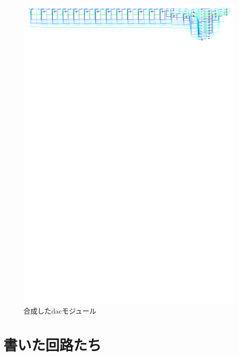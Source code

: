 \documentclass[a4paper,10pt]{article}
\begin{document}
\begin{figure}[H] %
  \centering
  \includegraphics[width=\linewidth]{dac.pdf}
  \caption{合成したdacモジュール}
  \label{fig:dac_module}
\end{figure}

\newpage
\section{書いた回路たち}

\newpage

\newpage

\newpage

\end{document}
